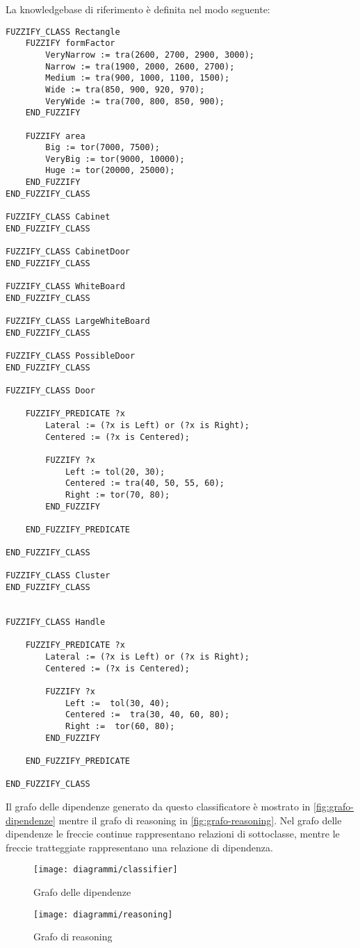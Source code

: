 La knowledgebase di riferimento è definita nel modo seguente:

\begin{lstlisting}[language=fuzzyKnowledgebase]
FUZZIFY_CLASS Rectangle
	FUZZIFY formFactor
		VeryNarrow := tra(2600, 2700, 2900, 3000);
		Narrow := tra(1900, 2000, 2600, 2700);
		Medium := tra(900, 1000, 1100, 1500); 
		Wide := tra(850, 900, 920, 970);
		VeryWide := tra(700, 800, 850, 900);
	END_FUZZIFY
	
	FUZZIFY area
		Big := tor(7000, 7500);
		VeryBig := tor(9000, 10000);
		Huge := tor(20000, 25000);
	END_FUZZIFY
END_FUZZIFY_CLASS

FUZZIFY_CLASS Cabinet
END_FUZZIFY_CLASS

FUZZIFY_CLASS CabinetDoor
END_FUZZIFY_CLASS

FUZZIFY_CLASS WhiteBoard
END_FUZZIFY_CLASS

FUZZIFY_CLASS LargeWhiteBoard
END_FUZZIFY_CLASS

FUZZIFY_CLASS PossibleDoor
END_FUZZIFY_CLASS

FUZZIFY_CLASS Door

	FUZZIFY_PREDICATE ?x
		Lateral := (?x is Left) or (?x is Right);
		Centered := (?x is Centered);
		
		FUZZIFY ?x
			Left := tol(20, 30);
			Centered := tra(40, 50, 55, 60);
			Right := tor(70, 80);
		END_FUZZIFY
		
	END_FUZZIFY_PREDICATE	
	
END_FUZZIFY_CLASS

FUZZIFY_CLASS Cluster
END_FUZZIFY_CLASS


FUZZIFY_CLASS Handle

	FUZZIFY_PREDICATE ?x
		Lateral := (?x is Left) or (?x is Right);
		Centered := (?x is Centered);
		
		FUZZIFY ?x
			Left :=  tol(30, 40);
			Centered :=  tra(30, 40, 60, 80);
			Right :=  tor(60, 80);
		END_FUZZIFY
		
	END_FUZZIFY_PREDICATE	
	
END_FUZZIFY_CLASS
\end{lstlisting}

Il grafo delle dipendenze generato da questo classificatore è mostrato in \autoref{fig:grafo-dipendenze} mentre il grafo di reasoning in \autoref{fig:grafo-reasoning}. Nel grafo delle dipendenze le freccie continue rappresentano relazioni di sottoclasse, mentre le freccie tratteggiate rappresentano una relazione di dipendenza.

\begin{figure}[ht]
  \texttt{[image: diagrammi/classifier]}
  \caption{Grafo delle dipendenze}
  \label{fig:grafo-dipendenze}
\end{figure}

\begin{figure}[ht]
  \texttt{[image: diagrammi/reasoning]}
  \caption{Grafo di reasoning}
  \label{fig:grafo-reasoning}
\end{figure}

